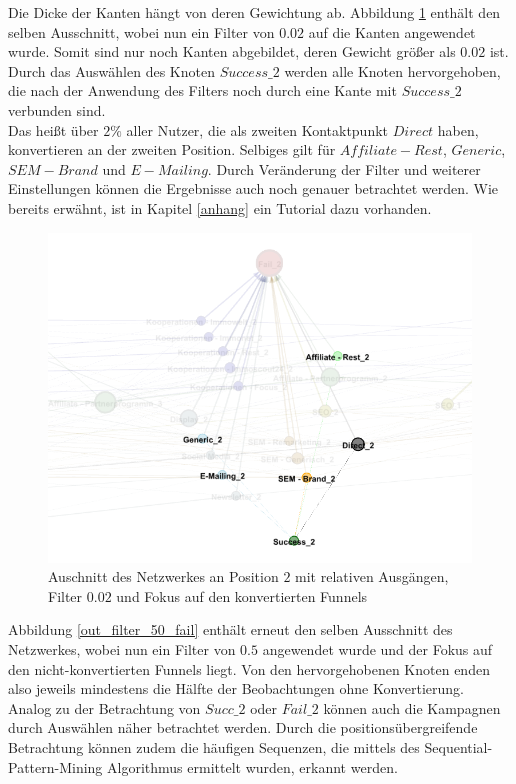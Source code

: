 Die Dicke der Kanten hängt von deren Gewichtung ab. Abbildung \ref{out_filter_2_succ} enthält den selben Ausschnitt, wobei nun ein Filter von $0.02$ auf die Kanten angewendet wurde. Somit sind nur noch Kanten abgebildet, deren Gewicht größer als $0.02$ ist. Durch das Auswählen des Knoten $Success\_2$ werden alle Knoten hervorgehoben, die nach der Anwendung des Filters noch durch eine Kante mit $Success\_2$ verbunden sind.\\
Das heißt über $2 \%$ aller Nutzer, die als zweiten Kontaktpunkt $Direct$ haben, konvertieren an der zweiten Position. Selbiges gilt für $Affiliate-Rest$, $Generic$, $SEM-Brand$ und $E-Mailing$. Durch Veränderung der Filter und weiterer Einstellungen können die Ergebnisse auch noch genauer betrachtet werden. Wie bereits erwähnt, ist in Kapitel \ref{anhang} ein Tutorial dazu vorhanden.
\begin{figure}[H]
	\centering\includegraphics[scale=0.4]{out_filter_2_succ.png}\caption{Auschnitt des Netzwerkes an Position $2$ mit relativen Ausgängen, Filter $0.02$ und Fokus auf den konvertierten Funnels}\label{out_filter_2_succ}
\end{figure}
Abbildung \ref{out_filter_50_fail} enthält erneut den selben Ausschnitt des Netzwerkes, wobei nun ein Filter von $0.5$ angewendet wurde und der Fokus auf den nicht-konvertierten Funnels liegt. Von den hervorgehobenen Knoten enden also jeweils mindestens die Hälfte der Beobachtungen ohne Konvertierung.\\
Analog zu der Betrachtung von $Succ\_2$ oder $Fail\_2$ können auch die Kampagnen durch Auswählen näher betrachtet werden. Durch die positionsübergreifende Betrachtung können zudem die häufigen Sequenzen, die mittels des Sequential-Pattern-Mining Algorithmus ermittelt wurden, erkannt werden.
